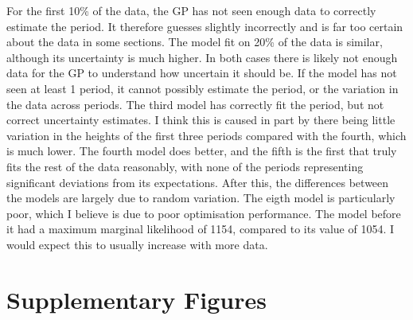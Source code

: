 \documentclass[10pt]{article}
\begin{document}
For the first 10\% of the data, the GP has not seen enough data to correctly estimate the period. It therefore guesses slightly incorrectly 
and is far too certain about the data in some sections. The model fit on 20\% of the data is similar, although its
uncertainty is much higher. In both cases there is likely not enough data for the GP to understand how uncertain it should be. If the
model has not seen at least 1 period, it cannot possibly estimate the period, or the variation in the data across periods. The third model
has correctly fit the period, but not correct uncertainty estimates. I think this is caused in part by there being little
variation in the heights of the first three periods compared with the fourth, which is much lower. The fourth model does better, and the 
fifth is the first that truly fits the rest of the data reasonably, with none of the periods representing significant deviations from its
expectations.
After this, the differences between the models are largely due to random variation. The eigth model is particularly poor, which I
believe is due to poor optimisation performance. The model before it had a maximum marginal likelihood of 1154, compared to its value of 1054.
I would expect this to usually increase with more data. 

\appendix
\section{Supplementary Figures}
\end{document}
